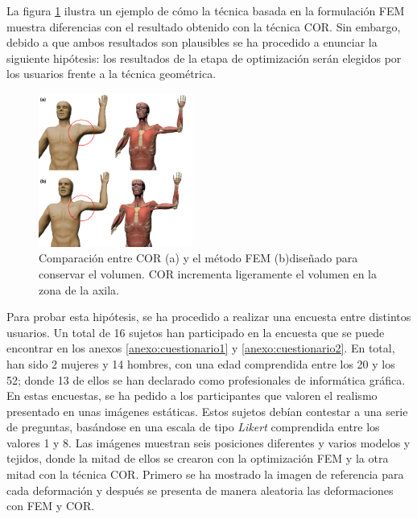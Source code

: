 La figura \ref{fig:anatomium} ilustra un ejemplo de cómo la técnica basada en la formulación \ac{FEM} muestra diferencias con el resultado obtenido con la técnica \ac{COR}. Sin embargo, debido a que ambos resultados son plausibles se ha procedido a enunciar la siguiente hipótesis: los resultados de la etapa de optimización serán elegidos por los usuarios frente a la técnica geométrica.
 
\begin{figure}[h]%
   \centering
   \includegraphics[width=0.45\textwidth]{IMG/AntCOR}
    \caption{ Comparación entre \ac{COR} (a) y el método \ac{FEM} (b)diseñado para conservar el volumen. \ac{COR} incrementa ligeramente el volumen en la zona de la axila.}
    \label{fig:anatomium}
\end{figure}
 
Para probar esta hipótesis, se ha procedido a realizar una encuesta entre distintos usuarios. Un total de 16 sujetos han participado en la encuesta que se puede encontrar en los anexos \ref{anexo:cuestionario1} y \ref{anexo:cuestionario2}. En total, han sido 2 mujeres y 14 hombres, con una edad comprendida entre los 20 y los 52; donde 13 de ellos se han declarado como profesionales de informática gráfica. En estas encuestas, se ha pedido a los participantes que valoren el realismo presentado en unas imágenes estáticas. Estos sujetos debían contestar a una serie de preguntas, basándose en una escala de tipo  \emph{Likert} comprendida entre los valores 1 y 8. Las imágenes muestran seis posiciones diferentes y varios modelos y tejidos, donde la mitad de ellos se crearon con la optimización \ac{FEM} y la otra mitad con la técnica \ac{COR}. Primero se ha mostrado la imagen de referencia para cada deformación y después se presenta de manera aleatoria las deformaciones con \ac{FEM} y \ac{COR}.

%


